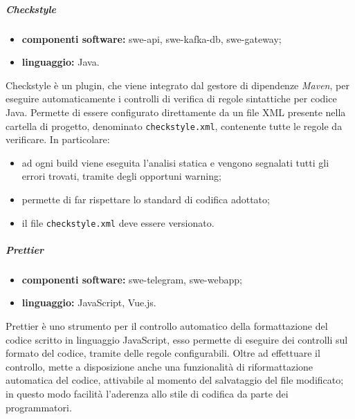                 \subparagraph{Checkstyle}

	                \begin{itemize}
	                    \item \textbf{componenti software:} swe-api, swe-kafka-db, swe-gateway;
	                    \item \textbf{linguaggio:} Java.
	                \end{itemize}
	                
	                Checkstyle è un plugin, che viene integrato dal gestore di dipendenze \textit{Maven}, per eseguire automaticamente i controlli di verifica di regole sintattiche per codice Java.
	                \newline
	                Permette di essere configurato direttamente da un file XML presente nella cartella di progetto, denominato \verb!checkstyle.xml!, contenente tutte le regole da verificare. In particolare:
	                \begin{itemize}
	                    \item ad ogni build viene eseguita l'analisi statica e vengono segnalati tutti gli errori trovati, tramite degli opportuni warning;
	                    \item permette di far rispettare lo standard di codifica adottato;
	                    \item il file \verb!checkstyle.xml! deve essere versionato.
	                \end{itemize}

                \subparagraph{Prettier}

	                \begin{itemize}
	                    \item \textbf{componenti software:} swe-telegram, swe-webapp;
	                    \item \textbf{linguaggio:} JavaScript, Vue.js.
	                \end{itemize}
	                
	                Prettier è uno strumento per il controllo automatico della formattazione del codice scritto in linguaggio JavaScript, esso permette di eseguire dei controlli sul formato del codice, tramite delle regole configurabili.
	                \newline
	                Oltre ad effettuare il controllo, mette a disposizione anche una funzionalità di riformattazione automatica del codice, attivabile al momento del salvataggio del file modificato; in questo modo facilità l'aderenza allo stile di codifica da parte dei programmatori.
				
